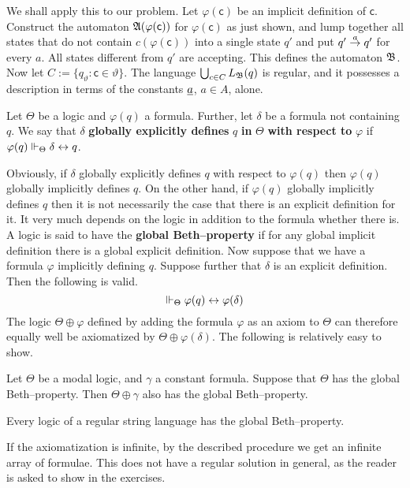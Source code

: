 We shall apply this to our problem. Let $\varphi(\mathsf{c})$ be an
implicit definition of $\mathsf{c}$. Construct the automaton
$\mathfrak{A}(\varphi(\mathsf{c}))$ for $\varphi(\mathsf{c})$
as just shown, and lump together all states that do not contain
$c(\varphi(\mathsf{c}))$ into a single state $q'$ and put
$q' \stackrel{a}{\rightarrow} q'$ for every $a$. All states different
from $q'$ are accepting. This defines the automaton $\mathfrak{B}$. Now
let $C := \{q_{\vartheta} : \mathsf{c} \in \vartheta\}$. The
language $\bigcup_{c \in C} L_{\mathfrak{B}}(q)$ is regular, and it
possesses a description in terms of the constants $\underline{a}$,
$a \in A$, alone.
\begin{defn}
Let $\Theta$ be a logic and $\varphi(q)$ a formula. Further, let
$\delta$ be a formula not containing $q$. We say that $\delta$
\textbf{globally explicitly defines} $q$ \textbf{in} $\Theta$
\textbf{with respect to} $\varphi$ if $\varphi(q) \Vdash_{\Theta}
\delta \leftrightarrow q$.
\end{defn}
Obviously, if $\delta$ globally explicitly defines $q$ with respect 
to $\varphi(q)$
then $\varphi(q)$ globally implicitly defines $q$. On the other hand,
if $\varphi(q)$ globally implicitly defines $q$ then it is not necessarily
the case that there is an explicit definition for it. It very much
depends on the logic in addition to the formula whether there is.
A logic is said to have the \textbf{global Beth--property} if for
any global implicit definition there is a global explicit definition.
Now suppose that we have a formula $\varphi$ implicitly
defining $q$. Suppose further that $\delta$ is an explicit definition.
Then the following is valid.
\begin{equation}
\Vdash_{\Theta} \varphi(q) \leftrightarrow \varphi(\delta)
\end{equation}
The logic $\Theta \oplus \varphi$ defined by adding the formula $\varphi$
as an axiom to $\Theta$ can therefore equally well be axiomatized by
$\Theta \oplus \varphi(\delta)$. The following is relatively easy
to show.
\begin{lem}
\label{lem:constantbeth}
Let $\Theta$ be a modal logic, and $\gamma$ a constant formula.
Suppose that $\Theta$ has the global Beth--property. Then
$\Theta \oplus \gamma$ also has the global Beth--property.
\end{lem}
\begin{thm}
\label{thm:regbeth}
Every logic of a regular string language has the global
Beth--property.
\end{thm}
If the axiomatization is infinite, by the described procedure we
get an infinite array of formulae. This does not have a regular
solution in general, as the reader is asked to show in the exercises.

